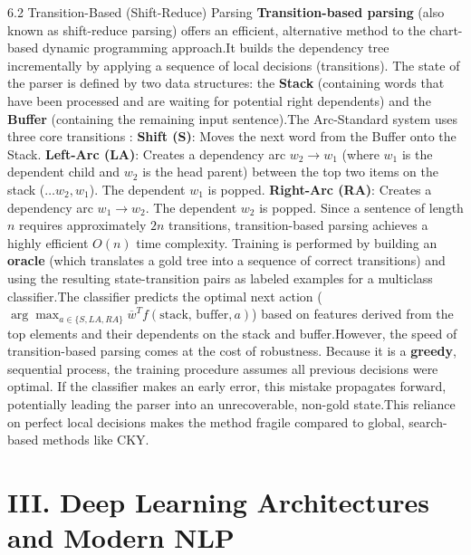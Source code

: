 \documentclass{article}
\begin{document}
6.2 Transition-Based (Shift-Reduce) Parsing
\textbf{Transition-based parsing} (also known as shift-reduce parsing) offers an efficient, alternative method to the chart-based dynamic programming approach.\footnotemark[1] It builds the dependency tree incrementally by applying a sequence of local decisions (transitions).
The state of the parser is defined by two data structures: the \textbf{Stack} (containing words that have been processed and are waiting for potential right dependents) and the \textbf{Buffer} (containing the remaining input sentence).\footnotemark[1]
The Arc-Standard system uses three core transitions \footnotemark[1]:
\textbf{Shift (S)}: Moves the next word from the Buffer onto the Stack.
\textbf{Left-Arc (LA)}: Creates a dependency arc $w_2 \rightarrow w_1$ (where $w_1$ is the dependent child and $w_2$ is the head parent) between the top two items on the stack ($\dots w_2, w_1$). The dependent $w_1$ is popped.
\textbf{Right-Arc (RA)}: Creates a dependency arc $w_1 \rightarrow w_2$. The dependent $w_2$ is popped.
Since a sentence of length $n$ requires approximately $2n$ transitions, transition-based parsing achieves a highly efficient $O(n)$ time complexity. Training is performed by building an \textbf{oracle} (which translates a gold tree into a sequence of correct transitions) and using the resulting state-transition pairs as labeled examples for a multiclass classifier.\footnotemark[1] The classifier predicts the optimal next action ($\arg\max_{a \in \{S, LA, RA\}} \overline{w}^T f(\text{stack, buffer}, a)$) based on features derived from the top elements and their dependents on the stack and buffer.\footnotemark[1]
However, the speed of transition-based parsing comes at the cost of robustness. Because it is a \textbf{greedy}, sequential process, the training procedure assumes all previous decisions were optimal. If the classifier makes an early error, this mistake propagates forward, potentially leading the parser into an unrecoverable, non-gold state.\footnotemark[1] This reliance on perfect local decisions makes the method fragile compared to global, search-based methods like CKY.

\part{III. Deep Learning Architectures and Modern NLP}
\end{document}
